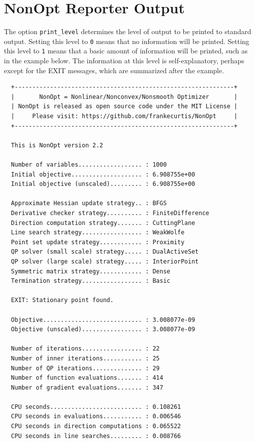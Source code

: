 \documentclass{article}
\begin{document}
\section{NonOpt Reporter Output}\label{sec.output}

The option \texttt{print\_level} determines the level of output to be printed to standard output.  Setting this level to \texttt{0} means that no information will be printed.  Setting this level to \texttt{1} means that a basic amount of information will be printed, such as in the example below.  The information at this level is self-explanatory, perhaps except for the EXIT messages, which are summarized after the example.

\begin{verbatim}
  +--------------------------------------------------------------+
  |       NonOpt = Nonlinear/Nonconvex/Nonsmooth Optimizer       |
  | NonOpt is released as open source code under the MIT License |
  |     Please visit: https://github.com/frankecurtis/NonOpt     |
  +--------------------------------------------------------------+

  This is NonOpt version 2.2

  Number of variables.................. : 1000
  Initial objective.................... : 6.908755e+00
  Initial objective (unscaled)......... : 6.908755e+00

  Approximate Hessian update strategy.. : BFGS
  Derivative checker strategy.......... : FiniteDifference
  Direction computation strategy....... : CuttingPlane
  Line search strategy................. : WeakWolfe
  Point set update strategy............ : Proximity
  QP solver (small scale) strategy..... : DualActiveSet
  QP solver (large scale) strategy..... : InteriorPoint
  Symmetric matrix strategy............ : Dense
  Termination strategy................. : Basic

  EXIT: Stationary point found.

  Objective............................ : 3.008077e-09
  Objective (unscaled)................. : 3.008077e-09

  Number of iterations................. : 22
  Number of inner iterations........... : 25
  Number of QP iterations.............. : 29
  Number of function evaluations....... : 414
  Number of gradient evaluations....... : 347

  CPU seconds.......................... : 0.108261
  CPU seconds in evaluations........... : 0.006546
  CPU seconds in direction computations : 0.065522
  CPU seconds in line searches......... : 0.008766
\end{verbatim}
\end{document}
